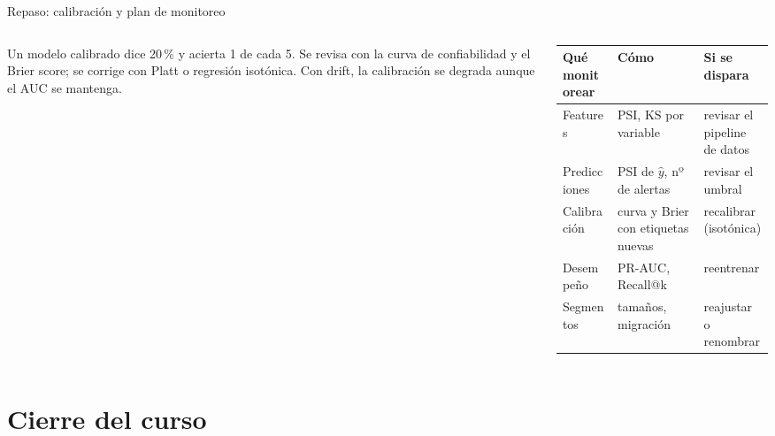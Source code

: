 \documentclass[aspectratio=169,12pt]{beamer}
\newcommand{\hrow}{\rowcolor{mlcream}}
\begin{document}
\begin{frame}{Repaso: calibración y plan de monitoreo}
  \begin{columns}[T]
    \begin{column}{0.36\textwidth}
      \begin{goldbox}[De la S1]
        \footnotesize Un modelo calibrado dice 20\,\% y acierta 1 de cada 5. Se revisa con la curva de confiabilidad y el Brier score; se corrige con Platt o regresión isotónica. Con drift, la calibración se degrada aunque el AUC se mantenga.
      \end{goldbox}
    \end{column}
    \begin{column}{0.6\textwidth}
      \centering\footnotesize
      \begin{tabular}{@{}L{0.26\textwidth} L{0.24\textwidth} L{0.36\textwidth}@{}}
        \toprule
        \hrow \textbf{Qué monitorear} & \textbf{Cómo} & \textbf{Si se dispara} \\
        \midrule
        Features & PSI, KS por variable & revisar el pipeline de datos \\
        Predicciones & PSI de $\hat y$, nº de alertas & revisar el umbral \\
        Calibración & curva y Brier con etiquetas nuevas & recalibrar (isotónica) \\
        Desempeño & PR-AUC, Recall@k & reentrenar \\
        Segmentos & tamaños, migración & reajustar o renombrar \\
        \bottomrule
      \end{tabular}
    \end{column}
  \end{columns}
\end{frame}

\section{Cierre del curso}
\end{document}

